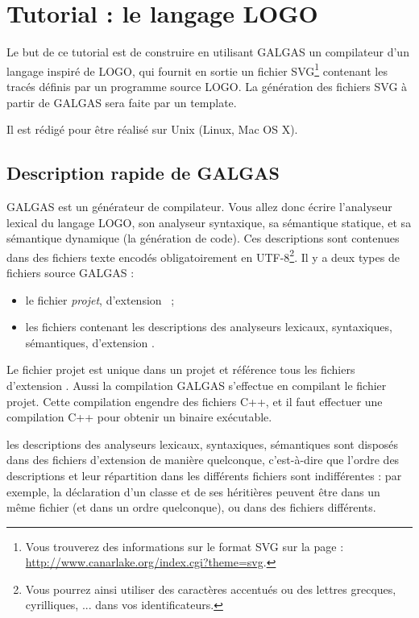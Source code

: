 
\chapter{Tutorial : le langage LOGO}

Le but de ce tutorial est de construire en utilisant GALGAS un compilateur d’un langage inspiré de LOGO, qui fournit en sortie un fichier SVG\footnote{Vous trouverez des informations sur le format SVG sur la page : \url{http://www.canarlake.org/index.cgi?theme=svg}.} contenant les tracés définis par un programme source LOGO. La génération des fichiers SVG à partir de GALGAS sera faite par un template.


Il est rédigé pour être réalisé sur Unix (Linux, Mac OS X).




\section{Description rapide de GALGAS}

GALGAS est un générateur de compilateur. Vous allez donc écrire l'analyseur lexical du langage LOGO, son analyseur syntaxique, sa sémantique statique, et sa sémantique dynamique (la génération de code). Ces descriptions sont contenues dans des fichiers texte encodés obligatoirement en UTF-8\footnote{Vous pourrez ainsi utiliser des caractères accentués ou des lettres grecques, cyrilliques, ... dans vos identificateurs.}. Il y a deux types de fichiers source GALGAS :
\begin{itemize}
\item le fichier \emph{projet}, d'extension ~;
\item les fichiers contenant les descriptions des analyseurs lexicaux, syntaxiques, sémantiques, d'extension .
\end{itemize}

Le fichier projet est unique dans un projet et référence tous les fichiers d'extension . Aussi la compilation GALGAS s'effectue en compilant le fichier projet. Cette compilation engendre des fichiers C++, et il faut effectuer une compilation C++ pour obtenir un binaire exécutable.

les descriptions des analyseurs lexicaux, syntaxiques, sémantiques sont disposés dans des fichiers d'extension  de manière quelconque, c'est-à-dire que l'ordre des descriptions et leur répartition dans les différents fichiers sont indifférentes : par exemple, la déclaration d'un classe et de ses héritières peuvent être dans un même fichier (et dans un ordre quelconque), ou dans des fichiers différents.

